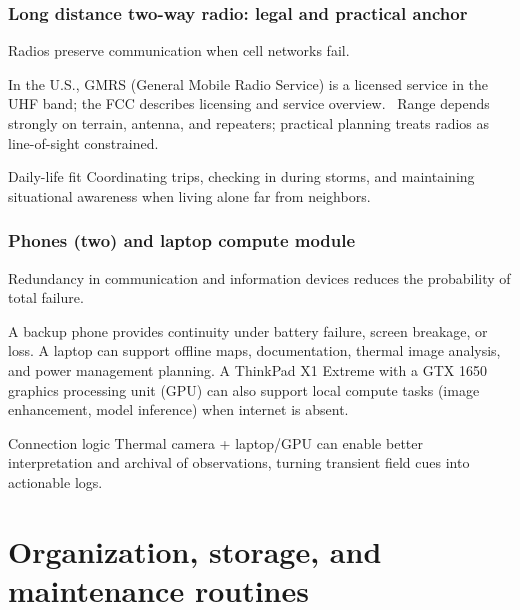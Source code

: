 \begin{frame}[t]
  \frametitle{Long distance two-way radio: legal and practical anchor}
  \justifying
   Radios preserve communication when cell networks fail.

  \vspace{0.5em}
   In the U.S., GMRS (General Mobile Radio Service) is a licensed service in the UHF band; the FCC describes licensing and service overview.~\cite{fcc_gmrs} Range depends strongly on terrain, antenna, and repeaters; practical planning treats radios as line-of-sight constrained.

  \vspace{0.8em}
  \begin{block}{Daily-life fit}
    Coordinating trips, checking in during storms, and maintaining situational awareness when living alone far from neighbors.
  \end{block}
\end{frame}

\begin{frame}[t]
  \frametitle{Phones (two) and laptop compute module}
  \justifying
   Redundancy in communication and information devices reduces the probability of total failure.

  \vspace{0.5em}
   A backup phone provides continuity under battery failure, screen breakage, or loss. A laptop can support offline maps, documentation, thermal image analysis, and power management planning. A ThinkPad X1 Extreme with a GTX 1650 graphics processing unit (GPU) can also support local compute tasks (image enhancement, model inference) when internet is absent.

  \vspace{0.8em}
  \begin{block}{Connection logic}
    Thermal camera + laptop/GPU can enable better interpretation and archival of observations, turning transient field cues into actionable logs.
  \end{block}
\end{frame}

\section{Organization, storage, and maintenance routines}

